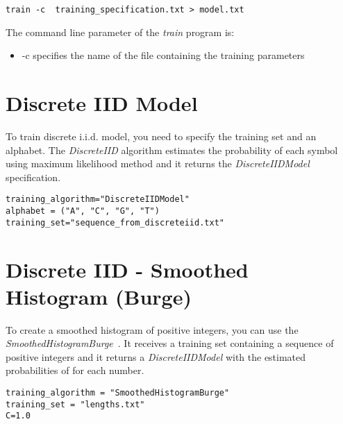 \vspace{1em}

\begin{Verbatim}[frame=single, label={Command line}]
train -c  training_specification.txt > model.txt
\end{Verbatim}

The command line parameter of the \textit{train} program is:

\begin{itemize}
\item -c specifies the name of the file containing the training parameters
\end{itemize}

\section{Discrete IID Model}

To train discrete i.i.d. model, you need to specify the training set and an alphabet. The \textit{DiscreteIID} algorithm estimates the probability of each symbol using maximum likelihood method and it returns the \textit{DiscreteIIDModel} specification.

\vspace{1em}
\begin{minipage}{\textwidth}
\begin{Verbatim}[frame=single,  label={trainiid.txt}]
training_algorithm="DiscreteIIDModel"
alphabet = ("A", "C", "G", "T")
training_set="sequence_from_discreteiid.txt"
\end{Verbatim}
\end{minipage}
\vspace{1em}

\section{Discrete IID - Smoothed Histogram (Burge)}

To create a smoothed histogram of positive integers, you can use the \textit{SmoothedHistogramBurge}~\cite{Burge1997}. It receives a training set containing a sequence of positive integers and it returns a \textit{DiscreteIIDModel} with the estimated probabilities of for each number.

\begin{Verbatim}[frame=single, label=train.txt]
training_algorithm = "SmoothedHistogramBurge"
training_set = "lengths.txt"
C=1.0
\end{Verbatim}

